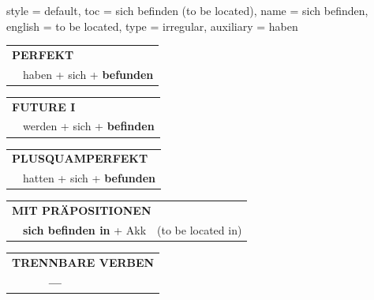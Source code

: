 \begin{verbentry}{
  style = {default},
  toc = {sich befinden (to be located)},
  name = {sich befinden},
  english = {to be located},
  type = {irregular},
  auxiliary = {haben}
}
 \begin{tabular}{rl}
     \multicolumn{2}{l}{\textbf{PERFEKT}}\\
    &haben + sich + \textbf{befunden}\\
  \end{tabular}
\hfill
   \begin{tabular}{rl}
   
    \multicolumn{2}{l}{\textbf{FUTURE I} }\\
    &werden + sich + \textbf{befinden}\\
 
  \end{tabular}
\hfill
   \begin{tabular}{rl}
      \multicolumn{2}{l}{\textbf{PLUSQUAMPERFEKT}}\\
    &hatten + sich + \textbf{befunden}\\
  \end{tabular}
  
\vspace{10pt}

   \begin{tabular}{lll}
      \multicolumn{3}{l}{\textbf{MIT PRÄPOSITIONEN}}\\
& \textbf{sich befinden in} + Akk & (to be located in)
  \end{tabular}
  \hfill
   \begin{tabular}{lll}
\multicolumn{3}{l}{\textbf{TRENNBARE VERBEN}}\\
& \textbf{---} & \\
\end{tabular}
  
  \vspace{-5pt}
\end{verbentry}

